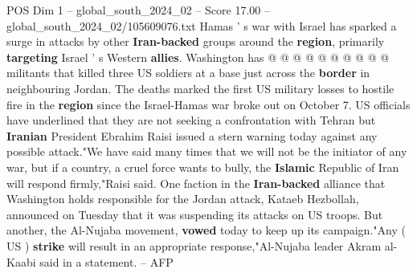 \begin{textsample}{POS Dim 1 – global\_south\_2024\_02 – Score 17.00 – global\_south\_2024\_02/105609076.txt}
Hamas ' s war with Israel has sparked a surge in attacks by other \textbf{Iran-backed} groups around the \textbf{region}, primarily \textbf{targeting} Israel ' s Western \textbf{allies}.
Washington has @ @ @ @ @ @ @ @ @ @ militants that killed three US soldiers at a base just across the \textbf{border} in neighbouring Jordan.
The deaths marked the first US military losses to hostile fire in the \textbf{region} since the Israel-Hamas war broke out on October 7.
US officials have underlined that they are not seeking a confrontation with Tehran but \textbf{Iranian} President Ebrahim Raisi issued a stern warning today against any possible attack."We have said many times that we will not be the initiator of any war, but if a country, a cruel force wants to bully, the \textbf{Islamic} Republic of Iran will respond firmly,"Raisi said.
One faction in the \textbf{Iran-backed} alliance that Washington holds responsible for the Jordan attack, Kataeb Hezbollah, announced on Tuesday that it was suspending its attacks on US troops.
But another, the Al-Nujaba movement, \textbf{vowed} today to keep up its campaign."Any ( US ) \textbf{strike} will result in an appropriate response,"Al-Nujaba leader Akram al-Kaabi said in a statement. -- AFP

\end{textsample}
